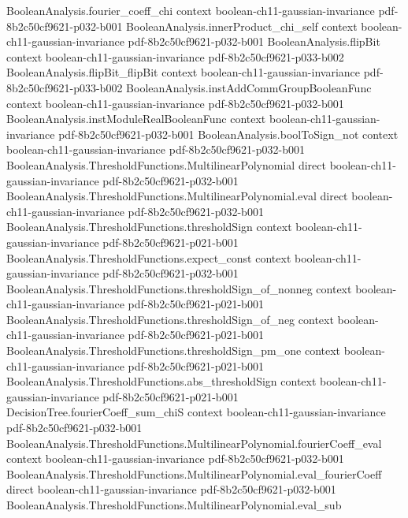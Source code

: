 \begin{theorem}
  {BooleanAnalysis.fourier_coeff_chi}
  {context}
  {boolean-ch11-gaussian-invariance}
  {pdf-8b2c50cf9621-p032-b001}
\proofstep
  {BooleanAnalysis.innerProduct_chi_self}
  {context}
  {boolean-ch11-gaussian-invariance}
  {pdf-8b2c50cf9621-p032-b001}
\proofstep
  {BooleanAnalysis.flipBit}
  {context}
  {boolean-ch11-gaussian-invariance}
  {pdf-8b2c50cf9621-p033-b002}
\proofstep
  {BooleanAnalysis.flipBit_flipBit}
  {context}
  {boolean-ch11-gaussian-invariance}
  {pdf-8b2c50cf9621-p033-b002}
\proofstep
  {BooleanAnalysis.instAddCommGroupBooleanFunc}
  {context}
  {boolean-ch11-gaussian-invariance}
  {pdf-8b2c50cf9621-p032-b001}
\proofstep
  {BooleanAnalysis.instModuleRealBooleanFunc}
  {context}
  {boolean-ch11-gaussian-invariance}
  {pdf-8b2c50cf9621-p032-b001}
\proofstep
  {BooleanAnalysis.boolToSign_not}
  {context}
  {boolean-ch11-gaussian-invariance}
  {pdf-8b2c50cf9621-p032-b001}
\proofstep
  {BooleanAnalysis.ThresholdFunctions.MultilinearPolynomial}
  {direct}
  {boolean-ch11-gaussian-invariance}
  {pdf-8b2c50cf9621-p032-b001}
\proofstep
  {BooleanAnalysis.ThresholdFunctions.MultilinearPolynomial.eval}
  {direct}
  {boolean-ch11-gaussian-invariance}
  {pdf-8b2c50cf9621-p032-b001}
\proofstep
  {BooleanAnalysis.ThresholdFunctions.thresholdSign}
  {context}
  {boolean-ch11-gaussian-invariance}
  {pdf-8b2c50cf9621-p021-b001}
\proofstep
  {BooleanAnalysis.ThresholdFunctions.expect_const}
  {context}
  {boolean-ch11-gaussian-invariance}
  {pdf-8b2c50cf9621-p032-b001}
\proofstep
  {BooleanAnalysis.ThresholdFunctions.thresholdSign_of_nonneg}
  {context}
  {boolean-ch11-gaussian-invariance}
  {pdf-8b2c50cf9621-p021-b001}
\proofstep
  {BooleanAnalysis.ThresholdFunctions.thresholdSign_of_neg}
  {context}
  {boolean-ch11-gaussian-invariance}
  {pdf-8b2c50cf9621-p021-b001}
\proofstep
  {BooleanAnalysis.ThresholdFunctions.thresholdSign_pm_one}
  {context}
  {boolean-ch11-gaussian-invariance}
  {pdf-8b2c50cf9621-p021-b001}
\proofstep
  {BooleanAnalysis.ThresholdFunctions.abs_thresholdSign}
  {context}
  {boolean-ch11-gaussian-invariance}
  {pdf-8b2c50cf9621-p021-b001}
\proofstep
  {DecisionTree.fourierCoeff_sum_chiS}
  {context}
  {boolean-ch11-gaussian-invariance}
  {pdf-8b2c50cf9621-p032-b001}
\proofstep
  {BooleanAnalysis.ThresholdFunctions.MultilinearPolynomial.fourierCoeff_eval}
  {context}
  {boolean-ch11-gaussian-invariance}
  {pdf-8b2c50cf9621-p032-b001}
\proofstep
  {BooleanAnalysis.ThresholdFunctions.MultilinearPolynomial.eval_fourierCoeff}
  {direct}
  {boolean-ch11-gaussian-invariance}
  {pdf-8b2c50cf9621-p032-b001}
\proofstep
  {BooleanAnalysis.ThresholdFunctions.MultilinearPolynomial.eval_sub}

\end{theorem}
